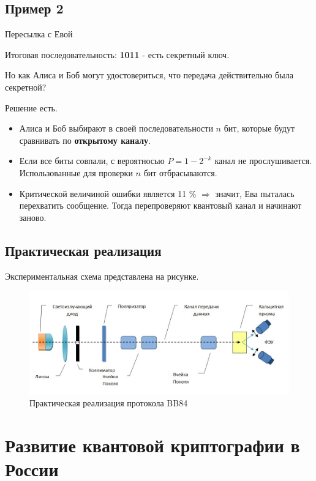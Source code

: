 \subsection{Пример 2}

\begin{table}[h!]
    \centering
    
    \caption{Пересылка с Евой}
    \label{tb3}
\end{table}

Итоговая последовательность: \textbf{1011} - есть секретный ключ.

Но как Алиса и Боб могут удостовериться, что передача действительно была секретной?

Решение есть. 
\begin{itemize}
    \item Алиса и Боб выбирают в своей последовательности $n$ бит, которые будут сравнивать по \textbf{открытому каналу}.
    \item Если все биты совпали, с вероятносью $P = 1 - 2^{-k}$ канал не прослушивается. Использованные для проверки $n$ бит отбрасываются.
    \item Критической величиной ошибки является 11 \% $\Rightarrow $ значит, Ева пыталась перехватить сообщение. Тогда перепроверяют квантовый канал и начинают заново.  
\end{itemize}

\subsection{Практическая реализация}

Экспериментальная схема представлена на рисунке.

\begin{figure}[h!]
    \centering
    \includegraphics[width=1.0\linewidth]{pics/bb84_realisation.jpg}
    \caption{Практическая реализация протокола BB84}
    \label{scheme}
\end{figure}


\section{Развитие квантовой криптографии в России}

